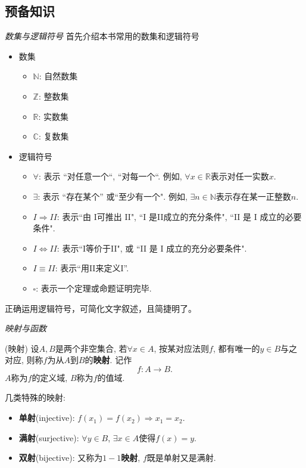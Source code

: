 
\subsection{预备知识}
\label{sec:preknowledge}

\textit{数集与逻辑符号}
\vspace{1em} 
首先介绍本书常用的数集和逻辑符号
\begin{itemize}
    \item 数集
    \begin{itemize}
        \item $\mathbb{N}$: 自然数集
        \item $\mathbb{Z}$: 整数集
        \item $\mathbb{R}$: 实数集
        \item $\mathbb{C}$: 复数集
    \end{itemize}
    \item 逻辑符号
    \begin{itemize}
        \item $\forall$: 表示 ``对任意一个“, ``对每一个“. 例如, $\forall x \in \mathbb{R}$表示对任一实数$x$.
        \item $\exists$: 表示 ``存在某个” 或``至少有一个". 例如, $\exists n \in \mathbb{N}$表示存在某一正整数$n$.
        \item $I\Rightarrow II$: 表示``由 I可推出 II", ``I 是II成立的充分条件", ``II 是 I 成立的必要条件". 
        \item $I\Leftrightarrow II$: 表示``I等价于II", 或 ``II 是 I 成立的充分必要条件".
        \item $I \equiv II$: 表示``用II来定义I''.
        \item $\square$: 表示一个定理或命题证明完毕.
    \end{itemize}
\end{itemize}
正确运用逻辑符号，可简化文字叙述，且简捷明了。

\vspace{1em}
\textit{ 映射与函数}
\vspace{1em} 
\begin{definition}{(映射)}
    设$A,B$是两个非空集合, 若$\forall x  \in A $, 按某对应法则$f$, 都有唯一的$y\in B$与之对应, 则称$f$为从$A$到$B$的\textbf{映射}. 
    记作
    \begin{equation}
        f: A \to B .
    \end{equation}
    $A$称为$f$的定义域, $B$称为$f$的值域.
\end{definition}
几类特殊的映射:
\begin{itemize}
    \item \textbf{单射}(injective): $f(x_1) = f(x_2) \Rightarrow x_1 = x_2$.
    \item \textbf{满射}(surjective): $\forall y \in B$, $\exists x \in A$使得$f(x) = y$.
    \item \textbf{双射}(bijective): 又称为\textbf{$1-1$映射}, $f$既是单射又是满射.
\end{itemize}

